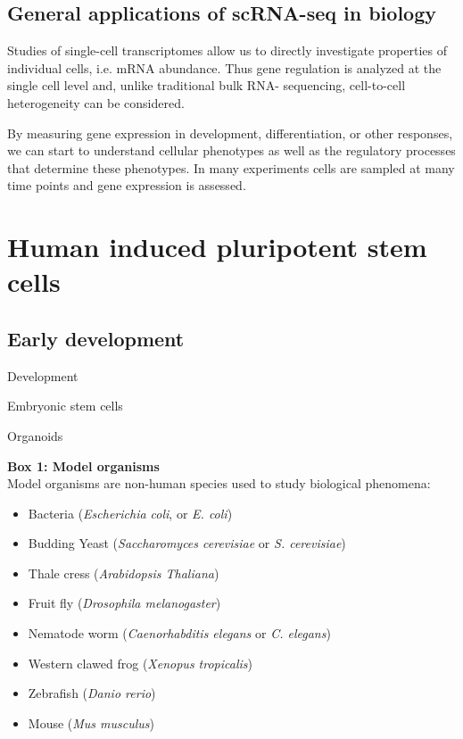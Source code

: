 \subsection{General applications of scRNA-seq in biology}

Studies of single-cell transcriptomes allow us to directly investigate properties of individual cells, i.e. mRNA abundance. 
Thus gene regulation is analyzed at the single cell level and, unlike traditional bulk RNA- sequencing, cell-to-cell heterogeneity can be considered.

By measuring gene expression in development, differentiation, or other responses, we can start to understand cellular phenotypes as well as the regulatory processes that determine these phenotypes. 
In many experiments cells are sampled at many time points and gene expression is assessed.

\section{Human induced pluripotent stem cells}  %

\subsection{Early development}

Development

Embryonic stem cells

Organoids



\begin{Comment}
\hspace{-2.5mm}\textbf{Box 1: Model organisms}\label{box1}\\

Model organisms are non-human species used to study biological phenomena:

\begin{itemize}
    \item Bacteria (\textit{Escherichia coli}, or \textit{E. coli})
    \item Budding Yeast (\textit{Saccharomyces cerevisiae} or \textit{S. cerevisiae})
    \item Thale cress (\textit{Arabidopsis Thaliana})
    \item Fruit fly (\textit{Drosophila melanogaster})
    \item Nematode worm (\textit{Caenorhabditis elegans} or \textit{C. elegans})
    \item Western clawed frog (\textit{Xenopus tropicalis})
    \item Zebrafish (\textit{Danio rerio})
    \item Mouse (\textit{Mus musculus})

\end{itemize}


\end{Comment}

